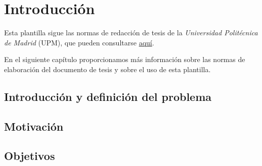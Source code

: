 %
\chapter{Introducción}
\label{ch::capitulo1}

Esta plantilla sigue las normas de redacción de tesis de la \textit{Universidad Politécnica de Madrid} (UPM), que pueden consultarse \href{https://www.upm.es/Estudiantes/Estudios_Titulaciones/Estudios_Doctorado/Tesis/NormasRedaccionTesis}{aquí}.

En el siguiente capítulo proporcionamos más información sobre las normas de elaboración del documento de tesis y sobre el uso de esta plantilla.
 

\section{Introducción y definición del problema}


\section{Motivación}

\section{Objetivos}